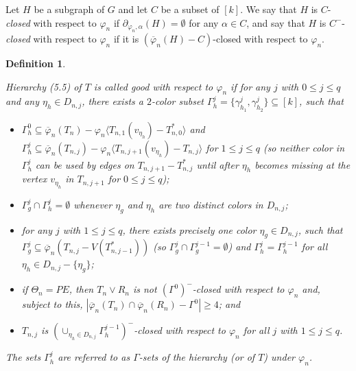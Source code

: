 \documentclass[11pt]{article}
\newtheorem{definition}[theorem]{Definition}
\newcommand{\phibar}{\overline{\varphi}}
\begin{document}
\vskip 1mm

Let $H$ be a subgraph of $G$ and let $C$ be a subset of $[k]$. We say that $H$ is $C$-{\em closed}\label{cclosed} with respect to 
$\varphi_n$ if $\partial_{\varphi_n, \alpha}(H)=\emptyset$ for any $\alpha \in C$, and say that $H$ is $C^-$-{\em closed}
with respect to $\varphi_n$ if it is $(\phibar_n(H)-C)$-closed with respect to $\varphi_n$.    

\begin{definition} \label{R2}
{\rm Hierarchy (5.5) of $T$ is called {\em good}\label{goodhierarchy} with respect to $\varphi_n$ if for any $j$ with $0 \le j \le q$ and 
any $\eta_h\in D_{n,j}$, there exists a $2$-color subset $\Gamma^{j}_h=\{\gamma^{j}_{h_1},\gamma^{j}_{h_2}\}\subseteq 
[k]$, such that
\begin{itemize}
\vspace{-2mm}
\item[(i)] $\Gamma^0_h \subseteq \phibar_n(T_n)-\varphi_n \langle T_{n,1}(v_{\eta_h})-T_{n,0}^* \rangle$ 
and $\Gamma^j_h \subseteq \phibar_n(T_{n,j})-\varphi_n \langle T_{n,j+1}(v_{\eta_h})-T_{n,j} \rangle$ for $1 \le j \le q$
(so neither color in $\Gamma^{j}_h$ can be used by edges on $T_{n,j+1}-T_{n,j}^*$ until after $\eta_h$ becomes 
missing at the vertex $v_{\eta_h}$ in $T_{n,j+1}$ for $0 \le j \le q$); 
\vspace{-2mm}
\item[(ii)] $\Gamma^{j}_{g} \cap \Gamma^{j}_{h}=\emptyset$ whenever $\eta_{g}$ and $\eta_{h}$ are two distinct colors in $D_{n,j}$;
\vspace{-2mm}
\item[(iii)] for any $j$ with $1\le j \le q$, there exists precisely one color $\eta_g\in D_{n,j}$, such that  
$\Gamma^{j}_{g} \subseteq \phibar_n(T_{n,j}-V(T_{n,j-1}^*))$ (so $\Gamma^{j}_{g} \cap \Gamma^{j-1}_{g} =\emptyset$)
and $\Gamma^{j}_{h}=\Gamma^{j-1}_{h}$ for all $\eta_h\in D_{n,j}-\{\eta_g\}$; 
\vspace{-2mm}
\item[(iv)] if $\Theta_n=PE$, then $T_{n}\vee R_n$ is not $(\Gamma^0)^-$-closed with respect to $\varphi_n$ and, subject 
to this, $|\phibar_n(T_n) \cap \phibar_n(R_n)-\Gamma^0|\ge 4$; and
\vspace{-2mm}
\item[(v)] $T_{n,j}$ is $(\cup_{\eta_h\in D_{n,j}}\Gamma^{j-1}_h)^-$-closed with respect to $\varphi_n$ 
for all $j$ with $1\le j \le q$.
\vspace{-2mm}
\end{itemize}
\noindent The sets $\Gamma^{j}_h$ are referred to as $\Gamma$-{\em sets}\label{gammasets} of the hierarchy (or of $T$) under $\varphi_n$.} 
\end{definition}
\end{document}
